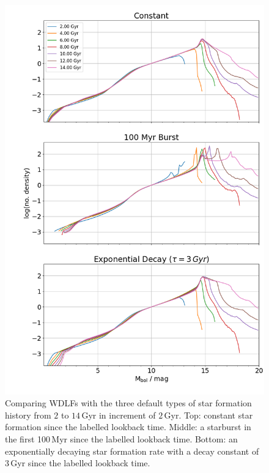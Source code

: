 \documentclass[fleqn,usenatbib]{rasti}
\begin{document}
\begin{figure}
    \centering
    \includegraphics[width=\columnwidth]{fig_09_wdlf_compare_sfr.png}
    \caption{Comparing WDLFs with the three default types of star formation
    history from $2$ to $14\,$Gyr in increment of $2$\,Gyr. Top: constant star
    formation since the labelled lookback time. Middle: a starburst in the 
    first 100\,Myr since the labelled lookback time. Bottom: an exponentially
    decaying star formation rate with a decay constant of 3\,Gyr since the
    labelled lookback time.}
    \label{fig:compare_sfr_age_type}
\end{figure}
\end{document}
